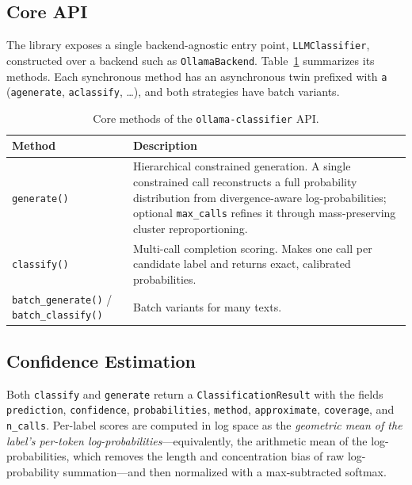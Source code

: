 \documentclass[11pt,a4paper]{article}
\begin{document}
\subsection{Core API}

The library exposes a single backend-agnostic entry point,
\texttt{LLMClassifier}, constructed over a backend such as
\texttt{OllamaBackend}. Table~\ref{tab:api} summarizes its methods. Each
synchronous method has an asynchronous twin prefixed with \texttt{a}
(\texttt{agenerate}, \texttt{aclassify}, \dots), and both strategies have
batch variants.

\begin{table}[htbp]
  \centering
  \caption{Core methods of the \texttt{ollama-classifier} API.}
  \label{tab:api}
  \begin{tabular}{lp{8.2cm}}
    \toprule
    \textbf{Method} & \textbf{Description} \\
    \midrule
    \texttt{generate()} & Hierarchical constrained generation. A single
                          constrained call reconstructs a full probability
                          distribution from divergence-aware log-probabilities;
                          optional \texttt{max\_calls} refines it through
                          mass-preserving cluster reproportioning. \\
    \texttt{classify()} & Multi-call completion scoring. Makes one call per
                          candidate label and returns exact, calibrated
                          probabilities. \\
    \texttt{batch\_generate()} / \texttt{batch\_classify()} & Batch variants
                          for many texts. \\
    \bottomrule
  \end{tabular}
\end{table}

\subsection{Confidence Estimation}
\label{sec:confidence}

Both \texttt{classify} and \texttt{generate} return a
\texttt{ClassificationResult} with the fields \texttt{prediction},
\texttt{confidence}, \texttt{probabilities}, \texttt{method},
\texttt{approximate}, \texttt{coverage}, and \texttt{n\_calls}. Per-label
scores are computed in log space as the \emph{geometric mean of the label's
per-token log-probabilities}---equivalently, the arithmetic mean of the
log-probabilities, which removes the length and concentration bias of raw
log-probability summation---and then normalized with a max-subtracted
softmax.
\end{document}
